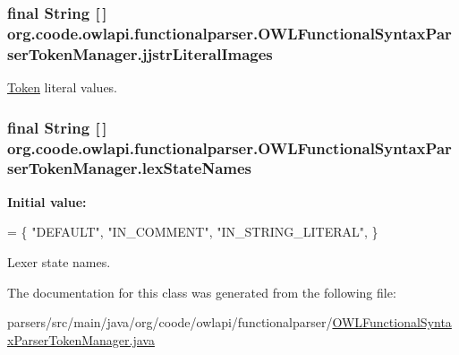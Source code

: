 \hypertarget{classorg_1_1coode_1_1owlapi_1_1functionalparser_1_1_o_w_l_functional_syntax_parser_token_manager_aa5e0f1069a6b0d2d65e44c9fb56168df}{
\subsubsection[{jjstr\-Literal\-Images}]{\setlength{\rightskip}{0pt plus 5cm}final String \mbox{[}$\,$\mbox{]} org.\-coode.\-owlapi.\-functionalparser.\-O\-W\-L\-Functional\-Syntax\-Parser\-Token\-Manager.\-jjstr\-Literal\-Images\hspace{0.3cm}{\ttfamily [static]}}}\label{classorg_1_1coode_1_1owlapi_1_1functionalparser_1_1_o_w_l_functional_syntax_parser_token_manager_aa5e0f1069a6b0d2d65e44c9fb56168df}
\hyperlink{classorg_1_1coode_1_1owlapi_1_1functionalparser_1_1_token}{Token} literal values. \hypertarget{classorg_1_1coode_1_1owlapi_1_1functionalparser_1_1_o_w_l_functional_syntax_parser_token_manager_abbcb1479fa6cc2f6edfbd5caf3042d75}{
\subsubsection[{lex\-State\-Names}]{\setlength{\rightskip}{0pt plus 5cm}final String \mbox{[}$\,$\mbox{]} org.\-coode.\-owlapi.\-functionalparser.\-O\-W\-L\-Functional\-Syntax\-Parser\-Token\-Manager.\-lex\-State\-Names\hspace{0.3cm}{\ttfamily [static]}}}\label{classorg_1_1coode_1_1owlapi_1_1functionalparser_1_1_o_w_l_functional_syntax_parser_token_manager_abbcb1479fa6cc2f6edfbd5caf3042d75}
{\bfseries Initial value\-:}
\begin{DoxyCode}
= \{
   \textcolor{stringliteral}{"DEFAULT"},
   \textcolor{stringliteral}{"IN\_COMMENT"},
   \textcolor{stringliteral}{"IN\_STRING\_LITERAL"},
\}
\end{DoxyCode}
Lexer state names. 

The documentation for this class was generated from the following file\-:\begin{DoxyCompactItemize}
\item 
parsers/src/main/java/org/coode/owlapi/functionalparser/\hyperlink{_o_w_l_functional_syntax_parser_token_manager_8java}{O\-W\-L\-Functional\-Syntax\-Parser\-Token\-Manager.\-java}\end{DoxyCompactItemize}
